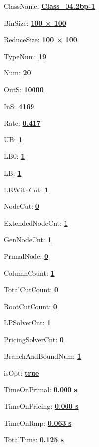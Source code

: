 \documentclass[11pt]{article}
\begin{document}
\pagestyle{empty}


ClassName: \underline{\textbf{Class_04.2bp-1}}
\par
BinSize: \underline{\textbf{100 × 100}}
\par
ReduceSize: \underline{\textbf{100 × 100}}
\par
TypeNum: \underline{\textbf{19}}
\par
Num: \underline{\textbf{20}}
\par
OutS: \underline{\textbf{10000}}
\par
InS: \underline{\textbf{4169}}
\par
Rate: \underline{\textbf{0.417}}
\par
UB: \underline{\textbf{1}}
\par
LB0: \underline{\textbf{1}}
\par
LB: \underline{\textbf{1}}
\par
LBWithCut: \underline{\textbf{1}}
\par
NodeCut: \underline{\textbf{0}}
\par
ExtendedNodeCnt: \underline{\textbf{1}}
\par
GenNodeCnt: \underline{\textbf{1}}
\par
PrimalNode: \underline{\textbf{0}}
\par
ColumnCount: \underline{\textbf{1}}
\par
TotalCutCount: \underline{\textbf{0}}
\par
RootCutCount: \underline{\textbf{0}}
\par
LPSolverCnt: \underline{\textbf{1}}
\par
PricingSolverCnt: \underline{\textbf{0}}
\par
BranchAndBoundNum: \underline{\textbf{1}}
\par
isOpt: \underline{\textbf{true}}
\par
TimeOnPrimal: \underline{\textbf{0.000 s}}
\par
TimeOnPricing: \underline{\textbf{0.000 s}}
\par
TimeOnRmp: \underline{\textbf{0.063 s}}
\par
TotalTime: \underline{\textbf{0.125 s}}
\par
\newpage
\end{document}
